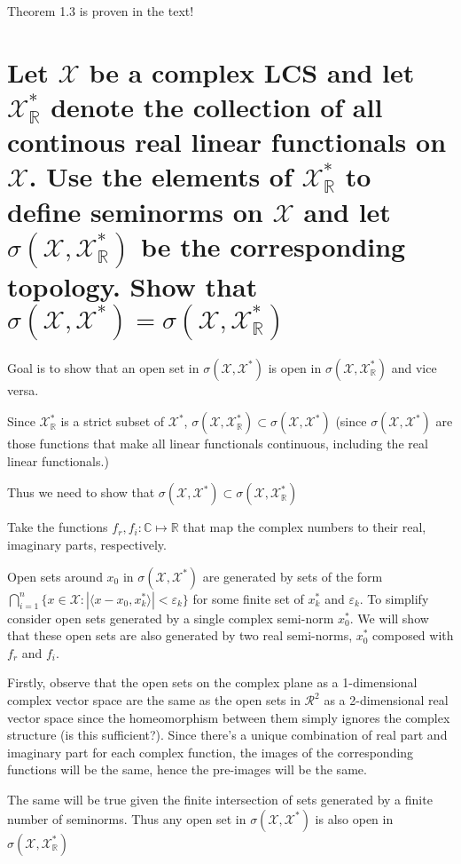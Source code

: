\documentclass{article}
\begin{document}
Theorem 1.3 is proven in the text!

\section{Let $\mathscr{X}$ be a complex LCS and let $\mathscr{X}^*_{\mathbb{R}}$ denote the collection of all continous real linear functionals on $\mathscr{X}$. Use the elements of $\mathscr{X}^*_{\mathbb{R}}$  to define seminorms on $\mathscr{X}$ and let $\sigma(\mathscr{X}, \mathscr{X}^*_{\mathbb{R}})$ be the corresponding topology. Show that $\sigma(\mathscr{X}, \mathscr{X}^*) = \sigma(\mathscr{X}, \mathscr{X}^*_{\mathbb{R}})$}

Goal is to show that an open set in $\sigma(\mathscr{X}, \mathscr{X}^*)$ is open in $\sigma(\mathscr{X}, \mathscr{X}^*_{\mathbb{R}})$ and vice versa.

Since $\mathscr{X}^*_{\mathbb{R}}$ is a strict subset of $\mathscr{X}^*$, $\sigma(\mathscr{X}, \mathscr{X}^*_{\mathbb{R}}) \subset \sigma(\mathscr{X}, \mathscr{X}^*)$ (since $\sigma(\mathscr{X}, \mathscr{X}^*)$ are those functions that make all linear functionals continuous, including the real linear functionals.)

Thus we need to show that $\sigma(\mathscr{X}, \mathscr{X}^*) \subset \sigma(\mathscr{X}, \mathscr{X}^*_{\mathbb{R}})$

Take the functions $f_r, f_i : \mathbb{C} \mapsto \mathbb{R}$ that map the complex numbers to their real, imaginary parts, respectively.

Open sets around $x_0$ in $\sigma(\mathscr{X}, \mathscr{X}^*)$ are generated by sets of the form $\bigcap^n_{i=1}\{x\in \mathscr{X} : |\langle x - x_0, x^*_k \rangle| < \varepsilon_k\}$ for some finite set of $x^*_k$ and $\varepsilon_k$. To simplify consider open sets generated by a single complex semi-norm $x^*_0$. We will show that these open sets are also generated by two real semi-norms, $x^*_0$ composed with $f_r$ and $f_i$. 

Firstly, observe that the open sets on the complex plane as a 1-dimensional complex vector space are the same as the open sets in $\mathscr{R}^2$ as a 2-dimensional real vector space since the homeomorphism between them simply ignores the complex structure (is this sufficient?). Since there's a unique combination of real part and imaginary part for each complex function, the images of the corresponding functions will be the same, hence the pre-images will be the same.

The same will be true given the finite intersection of sets generated by a finite number of seminorms. Thus any open set in $\sigma(\mathscr{X}, \mathscr{X}^*)$ is also open in $\sigma(\mathscr{X}, \mathscr{X}^*_{\mathbb{R}})$
\end{document}
